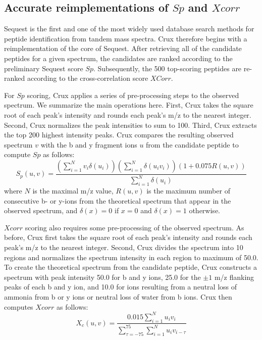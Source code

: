 \documentclass[12pt]{article}
\begin{document}
\subsection{Accurate reimplementations of $Sp$ and $Xcorr$}

{\sc Sequest} is the first and one of the most widely used database
search methods for peptide identification from tandem mass spectra.
Crux therefore begins with a reimplementation of the core of {\sc
Sequest}.  After retrieving all of the candidate peptides for a given
spectrum, the candidates are ranked according to the preliminary {\sc
Sequest} score $Sp$.  Subsequently, the 500 top-scoring peptides are
re-ranked according to the cross-correlation score $XCorr$.

For $Sp$ scoring, Crux applies a series of pre-processing steps to the
observed spectrum.  We summarize the main operations here.  First,
Crux takes the square root of each peak's intensity and rounds each
peak's m/z to the nearest integer.  Second, Crux normalizes the peak
intensities to sum to 100.  Third, Crux extracts the top 200 highest
intensity peaks.  Crux compares the resulting observed spectrum $v$
with the b and y fragment ions $u$ from the candidate peptide to
compute $Sp$ as follows:
\[
S_p(u, v) = \frac{
\left(\sum_{i=1}^N v_i \delta(u_i) \right)
\left(\sum_{i=1}^N \delta(u_i v_i)\right)
\left(1 + 0.075 R(u, v) \right)
}{\sum_{i=1}^N \delta(u_i)}
\]
where $N$ is the maximal m/z value, $R(u, v)$ is the maximum number of
consecutive b- or y-ions from the theoretical spectrum that appear in
the observed spectrum, and $\delta(x) = 0$ if $x=0$ and $\delta(x) =
1$ otherwise.

$Xcorr$ scoring also requires some pre-processing of the observed
spectrum.  As before, Crux first takes the square root of each peak's
intensity and rounds each peak's m/z to the nearest integer.  Second,
Crux divides the spectrum into 10 regions and normalizes the spectrum
intensity in each region to maximum of 50.0. To create the theoretical
spectrum from the candidate peptide, Crux constructs a spectrum with
peak intensity 50.0 for b and y ions, 25.0 for the $\pm 1$ m/z flanking
peaks of each b and y ion, and 10.0 for ions resulting from a neutral
loss of ammonia from b or y ions or neutral loss of water from b ions.
Crux then computes $Xcorr$ as follows:
\[
X_c(u, v) = \frac{0.015\sum_{i=1}^N u_i v_i}
{\sum_{\tau=-75}^{75} \sum_{i=1}^N u_i v_{i-\tau}}
\]
\end{document}
